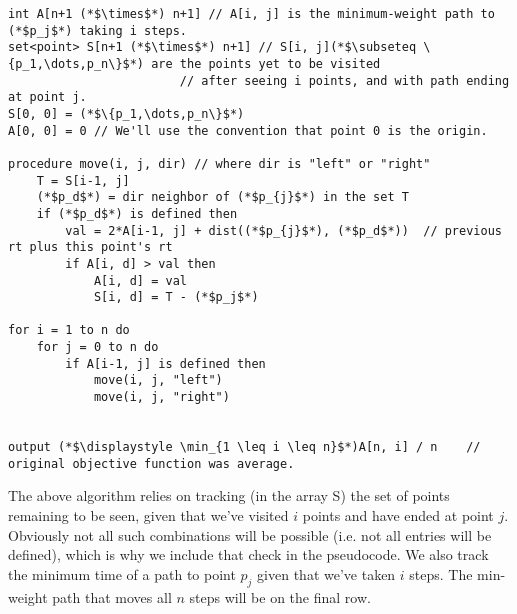 \documentclass{article}
\begin{document}
\begin{lstlisting}
int A[n+1 (*$\times$*) n+1] // A[i, j] is the minimum-weight path to (*$p_j$*) taking i steps.
set<point> S[n+1 (*$\times$*) n+1] // S[i, j](*$\subseteq \{p_1,\dots,p_n\}$*) are the points yet to be visited
                        // after seeing i points, and with path ending at point j.
S[0, 0] = (*$\{p_1,\dots,p_n\}$*)
A[0, 0] = 0 // We'll use the convention that point 0 is the origin.

procedure move(i, j, dir) // where dir is "left" or "right"
    T = S[i-1, j]
    (*$p_d$*) = dir neighbor of (*$p_{j}$*) in the set T
    if (*$p_d$*) is defined then
        val = 2*A[i-1, j] + dist((*$p_{j}$*), (*$p_d$*))  // previous rt plus this point's rt
        if A[i, d] > val then
            A[i, d] = val
            S[i, d] = T - (*$p_j$*)

for i = 1 to n do
    for j = 0 to n do
        if A[i-1, j] is defined then
            move(i, j, "left")
            move(i, j, "right")


output (*$\displaystyle \min_{1 \leq i \leq n}$*)A[n, i] / n    // original objective function was average.
\end{lstlisting}

The above algorithm relies on tracking (in the array S) the set of points remaining to be seen, given that we've visited $i$ points and have ended at point $j$. Obviously not all such combinations will be possible (i.e. not all entries will be defined), which is why we include that check in the pseudocode. We also track the minimum time of a path to point $p_j$ given that we've taken $i$ steps. The min-weight path that moves all $n$ steps will be on the final row.
\end{document}
